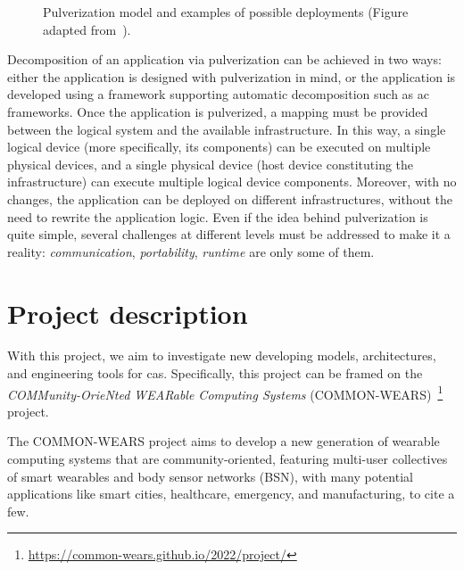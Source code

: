 \documentclass[12pt,a4paper]{article}
\begin{document}
\begin{figure}[ht]
\begin{minipage}{\columnwidth}
\begin{minipage}{0.48\columnwidth}
		\end{minipage}
	\end{minipage}

	\caption{
		Pulverization model and examples of possible deployments (Figure adapted from~\cite{DBLP:journals/fi/CasadeiPPVW20}).
	}
	\label{fig:pulv}
\end{figure}
%
Decomposition of an application via pulverization can be achieved in two ways:
either the application is designed with pulverization in mind,
or the application is developed using a framework supporting automatic decomposition such as \ac{ac} frameworks.
%
Once the application is pulverized,
a mapping must be provided between the logical system and the available infrastructure.
%
In this way,
a single logical device (more specifically, its components) can be executed on multiple physical devices,
and a single physical device (host device constituting the infrastructure) can execute multiple logical device components.
%
Moreover,
with no changes,
the application can be deployed on different infrastructures,
without the need to rewrite the application logic.
%
Even if the idea behind pulverization is quite simple,
several challenges at different levels must be addressed to make it a reality:
\emph{communication}, \emph{portability}, \emph{runtime} are only some of them.


\newpage


\section{Project description}\label{sec:project-description}
With this project,
we aim to investigate new developing models,
architectures,
and engineering tools for \ac{cas}.
%
Specifically,
this project can be framed on the \emph{COMMunity-OrieNted WEARable Computing Systems} (COMMON-WEARS)~\footnote{\url{https://common-wears.github.io/2022/project/}} project.

The COMMON-WEARS project aims to develop a new generation of wearable computing systems that are community-oriented,
featuring multi-user collectives of smart wearables and body sensor networks (BSN),
with many potential applications like smart cities,
healthcare,
emergency,
and manufacturing, to cite a few.
\end{document}
